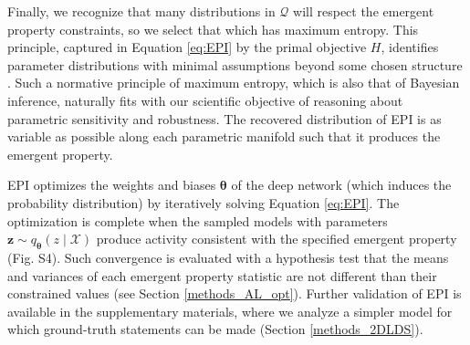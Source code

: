 \documentclass[11pt]{article}
\begin{document}
Finally, we recognize that many distributions in $\mathcal{Q}$ will respect the emergent property constraints, so we select that which has maximum entropy.
This principle, captured in Equation \ref{eq:EPI} by the primal objective $H$, identifies parameter distributions with minimal assumptions beyond some chosen structure \cite{jaynes1957information, elsayed2017structure, loaiza2017maximum, savin2017maximum}.
Such a normative principle of maximum entropy, which is also that of Bayesian inference, naturally fits with our scientific objective of reasoning about parametric sensitivity and robustness. 
The recovered distribution of EPI is as variable as possible along each parametric manifold such that it produces the emergent property.

EPI optimizes the weights and biases $\bm{\theta}$ of the deep network (which induces the probability distribution) by iteratively solving Equation \ref{eq:EPI}. 
The optimization is complete when the sampled models with parameters $\mathbf{z} \sim q_{\bm{\theta}}(z \mid \mathcal{X})$ produce activity consistent with the specified emergent property (Fig. S4).
Such convergence is evaluated with a hypothesis test that the means and variances of each emergent property statistic are not different than their constrained values (see Section \ref{methods_AL_opt}). 
Further validation of EPI is available in the supplementary materials, where we analyze a simpler model for which ground-truth statements can be made (Section \ref{methods_2DLDS}).
\end{document}

